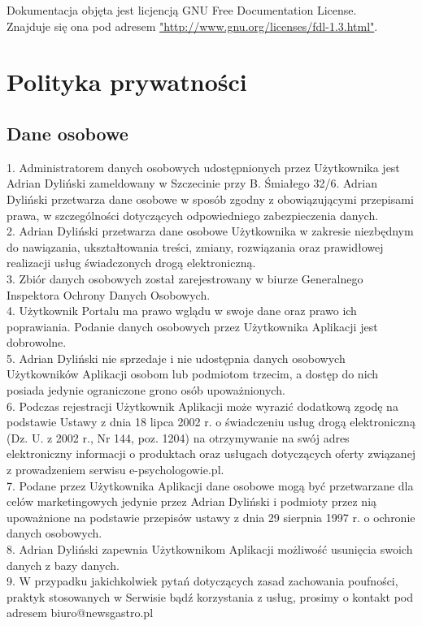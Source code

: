 \documentclass[12pt,leqno, twoside]{mwart}
\begin{document}
Dokumentacja objęta jest licjencją GNU Free Documentation License. \\
Znajduje się ona pod adresem \url{"http://www.gnu.org/licenses/fdl-1.3.html"}.
\section{Polityka prywatności}

\subsection{Dane osobowe}
1. Administratorem danych osobowych udostępnionych przez Użytkownika jest 
Adrian Dyliński zameldowany w Szczecinie przy B. Śmiałego 32/6. Adrian Dyliński przetwarza dane osobowe w sposób zgodny z obowiązującymi przepisami prawa, w szczególności dotyczących odpowiedniego zabezpieczenia danych. \\
2. Adrian Dyliński przetwarza dane osobowe Użytkownika w zakresie niezbędnym do nawiązania, ukształtowania treści, zmiany, rozwiązania oraz prawidłowej realizacji usług świadczonych drogą elektroniczną. \\
3. Zbiór danych osobowych został zarejestrowany w biurze Generalnego Inspektora Ochrony Danych Osobowych. \\
4. Użytkownik Portalu ma prawo wglądu w swoje dane oraz prawo ich poprawiania. Podanie danych osobowych przez Użytkownika Aplikacji jest dobrowolne. \\
5. Adrian Dyliński nie sprzedaje i nie udostępnia danych osobowych Użytkowników Aplikacji osobom lub podmiotom trzecim, a dostęp do nich posiada jedynie ograniczone grono osób upoważnionych.  \\
6. Podczas rejestracji Użytkownik Aplikacji może wyrazić dodatkową zgodę na podstawie Ustawy z dnia 18 lipca 2002 r. o świadczeniu usług drogą elektroniczną (Dz. U. z 2002 r., Nr 144, poz. 1204) na otrzymywanie na swój adres elektroniczny informacji o produktach oraz usługach dotyczących oferty związanej z prowadzeniem serwisu e-psychologowie.pl. \\
7. Podane przez Użytkownika Aplikacji dane osobowe mogą być przetwarzane dla celów marketingowych jedynie przez Adrian Dyliński i podmioty przez nią upoważnione na podstawie przepisów ustawy z dnia 29 sierpnia 1997 r. o ochronie danych osobowych. \\
8. Adrian Dyliński zapewnia Użytkownikom Aplikacji możliwość usunięcia swoich danych z bazy danych.  \\
9. W przypadku jakichkolwiek pytań dotyczących zasad zachowania poufności, praktyk stosowanych w Serwisie bądź korzystania z usług, prosimy o kontakt pod adresem biuro@newsgastro.pl
\end{document}

